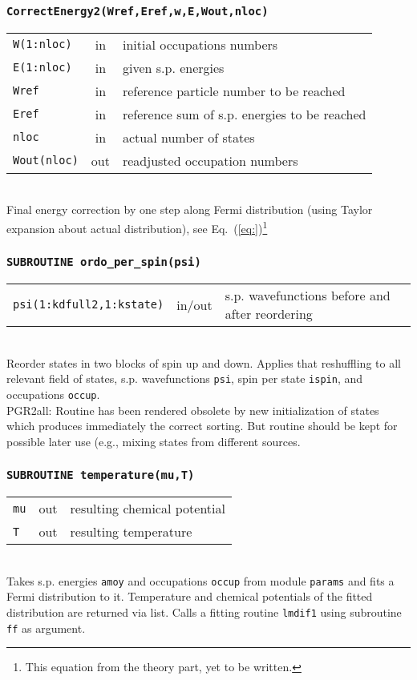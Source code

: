 \documentclass[final,1p]{elsarticle}
\newcommand{\PGRcomm}[1]{{\color{blue}\small PGR2all: #1}}
\newcommand{\PGRfoot}[1]{{\color{blue}\footnote{\color{blue} #1}}}
\begin{document}
\subsubsection*{\tt CorrectEnergy2(Wref,Eref,w,E,Wout,nloc)}
\begin{tabular}{lcl}
 {\tt W(1:nloc)} & in & initial occupations numbers\\
 {\tt E(1:nloc)} & in & given s.p. energies\\
 {\tt Wref} & in & reference particle number to be reached\\
 {\tt Eref} & in &  reference sum of s.p. energies to be reached\\
 {\tt nloc} & in & actual number of states\\
 {\tt Wout(nloc)} & out  & readjusted occupation numbers\\
\end{tabular}
\\[4pt]
Final energy correction by one step along Fermi distribution
(using Taylor expansion about actual distribution),
see Eq.~(\ref{eq:})\PGRfoot{This equation from the
  theory part, yet to be written.}



\subsubsection*{\tt SUBROUTINE ordo\_per\_spin(psi)}
\begin{tabular}{lcl}
 {\tt psi(1:kdfull2,1:kstate)} & in/out & s.p. wavefunctions before
 and after reordering\\
\end{tabular}
\\[4pt]
Reorder states  in two blocks of spin up and down.
Applies that reshuffling to all relevant field of states,
s.p. wavefunctions {\tt psi}, spin per state {\tt ispin},
and occupations {\tt occup}. 
\\
\PGRcomm{Routine has been rendered obsolete by new initialization of
  states which produces immediately the correct sorting. But routine
  should be kept for possible later use (e.g., mixing states from
  different sources.}

\subsubsection*{\tt SUBROUTINE temperature(mu,T)}
\begin{tabular}{lcl}
 {\tt mu} & out & resulting chemical potential\\
 {\tt T} & out & resulting temperature\\
\end{tabular}
\\[4pt]
Takes s.p. energies {\tt amoy} and occupations {\tt occup} from module
{\tt params} and fits a Fermi distribution to it. Temperature and
chemical potentials of the fitted distribution are returned via list.
Calls a fitting routine {\tt lmdif1} using subroutine {\tt ff} as argument.
\end{document}
